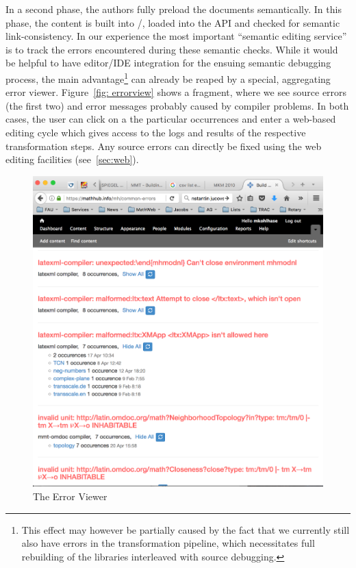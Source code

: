 In a second phase, the authors fully preload the documents semantically. In this phase,
the content is built into \omdoc/\mmt, loaded into the \mmt API and checked for semantic
link-consistency. In our experience the most important ``semantic editing service'' is to
track the errors encountered during these semantic checks. While it would be helpful to
have editor/IDE integration for the ensuing semantic debugging process, the main
advantage\footnote{This effect may however be partially caused by the fact that we
  currently still also have errors in the transformation pipeline, which necessitates full
  rebuilding of the \sys libraries interleaved with source debugging.}  can already be
reaped by a special, aggregating error viewer.  Figure~\ref{fig: errorview} shows a
fragment, where we see source errors (the first two) and error messages probably caused by
compiler problems. In both cases, the user can click on a the particular occurrences and
enter a web-based editing cycle which gives access to the logs and results of the
respective transformation steps. Any source errors can directly be fixed using the web
editing facilities (see~\ref{sec:web}).

\begin{figure}[ht]\centering
  \includegraphics[width=12cm]{errorview}
  \caption{The \sys Error Viewer}\label{fig:errorview}
\end{figure}


